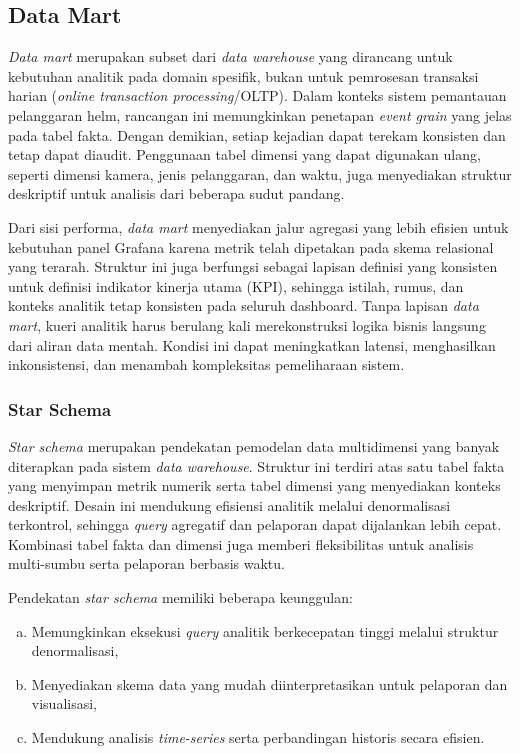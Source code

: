 \subsection{Data Mart}

\textit{Data mart} merupakan subset dari \textit{data warehouse} yang
dirancang untuk kebutuhan analitik pada domain spesifik, bukan untuk
pemrosesan transaksi harian (\textit{online transaction processing}/OLTP).
Dalam konteks sistem pemantauan pelanggaran helm, rancangan ini memungkinkan
penetapan \textit{event grain} yang jelas pada tabel fakta. Dengan demikian,
setiap kejadian dapat terekam konsisten dan tetap dapat diaudit. Penggunaan
tabel dimensi yang dapat digunakan ulang, seperti dimensi kamera, jenis
pelanggaran, dan waktu, juga menyediakan struktur deskriptif untuk
analisis dari beberapa sudut pandang.

Dari sisi performa, \textit{data mart} menyediakan jalur agregasi yang
lebih efisien untuk kebutuhan panel Grafana karena metrik telah dipetakan pada
skema relasional yang terarah. Struktur ini juga berfungsi sebagai lapisan
definisi yang konsisten untuk definisi indikator kinerja utama (KPI), sehingga
istilah, rumus, dan konteks analitik tetap konsisten pada seluruh dashboard.
Tanpa lapisan \textit{data mart}, kueri analitik harus berulang kali
merekonstruksi logika bisnis langsung dari aliran data mentah. Kondisi ini
dapat meningkatkan latensi, menghasilkan inkonsistensi, dan menambah kompleksitas
pemeliharaan sistem.

\subsubsection{Star Schema}

\textit{Star schema} merupakan pendekatan pemodelan data multidimensi yang
banyak diterapkan pada sistem \textit{data warehouse}. Struktur ini terdiri
atas satu tabel fakta yang menyimpan metrik numerik serta tabel dimensi yang
menyediakan konteks deskriptif. Desain ini mendukung efisiensi analitik
melalui denormalisasi terkontrol, sehingga \textit{query} agregatif dan
pelaporan dapat dijalankan lebih cepat. Kombinasi tabel fakta dan dimensi juga
memberi fleksibilitas untuk analisis multi-sumbu serta pelaporan berbasis
waktu.

Pendekatan \textit{star schema} memiliki beberapa keunggulan:
\begin{enumerate}[a.]
\item Memungkinkan eksekusi \textit{query} analitik berkecepatan tinggi melalui struktur denormalisasi,
\item Menyediakan skema data yang mudah diinterpretasikan untuk pelaporan dan visualisasi,
\item Mendukung analisis \textit{time-series} serta perbandingan historis secara efisien.
\end{enumerate}

